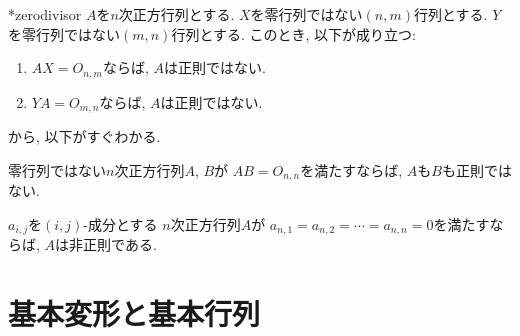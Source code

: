 \begin{prop}
  \provelater**{zerodivisor}
  \label{prop:zerodiv}
  $A$を$n$次正方行列とする.
  $X$を零行列ではない$(n,m)$行列とする.
  $Y$を零行列ではない$(m,n)$行列とする.
  このとき, 以下が成り立つ:
  \begin{enumerate}
  \item{}
    \label{prop:zerodiv:left}
    $AX=O_{n,m}$ならば, $A$は正則ではない.
  \item{}
    \label{prop:zerodiv:right}
    $YA=O_{m,n}$ならば, $A$は正則ではない.
  \end{enumerate}
\end{prop}

から, 以下がすぐわかる.
\begin{cor}
  零行列ではない$n$次正方行列$A$, $B$が
  $AB=O_{n,n}$を満たすならば,
  $A$も$B$も正則ではない.
\end{cor}

\begin{cor}
  $a_{i,j}$を$(i,j)$-成分とする
  $n$次正方行列$A$が
  $a_{n,1}=a_{n,2}=\cdots=a_{n,n}=0$を満たすならば,
  $A$は非正則である.
\end{cor}

\section{基本変形と基本行列}


